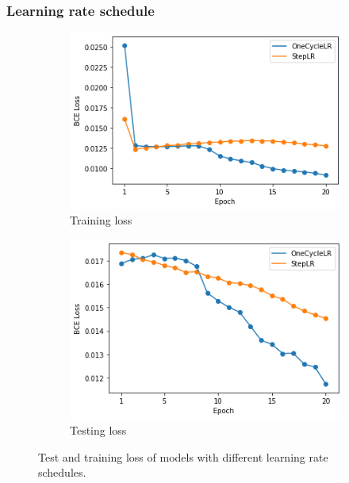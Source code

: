 \subsubsection{Learning rate schedule}

\begin{figure}
  \begin{subfigure}[t]{.5\textwidth}
    \centering
    \includegraphics[width=\textwidth]{figures/supervised_approach/scheduler_train_loss.png}
    \caption{Training loss}
    \label{fig:scheduler_train_loss}
  \end{subfigure}
   \begin{subfigure}[t]{.5\textwidth}
    \centering
    \includegraphics[width=\textwidth]{figures/supervised_approach/scheduler_test_loss.png}
    \caption{Testing loss}
    \label{fig:scheduler_test_loss}
  \end{subfigure}
  \caption{Test and training loss of models with different learning rate schedules.}
  \label{fig:scheduler_train}
\end{figure}

